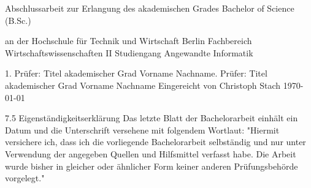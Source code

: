 \begin{titlepage}
	\huge{Abschlussarbeit}\newline
	\newline
	\normalsize
	zur Erlangung des akademischen Grades\newline
	Bachelor of Science (B.Sc.)\newline
	
	
	
	
	an der Hochschule für Technik und Wirtschaft Berlin\newline
	Fachbereich Wirtschaftswissenschaften II\newline
	Studiengang Angewandte Informatik
	
	\vfill
	
	1. Prüfer: Titel akademischer Grad Vorname Nachname. Prüfer: Titel akademischer Grad Vorname Nachname\newline
	\newline
	Eingereicht von Christoph Stach\newline
	\newline
	\today\newline
	
	\vfill
	
	7.5 Eigenständigkeitserklärung\newline
	Das letzte Blatt der Bachelorarbeit einhält ein Datum und die Unterschrift versehene mit folgendem Wortlaut:\newline
	\newline
	"Hiermit versichere ich, dass ich die vorliegende Bachelorarbeit selbständig und nur unter Verwendung der angegeben Quellen und Hilfsmittel verfasst habe. Die Arbeit wurde bisher in gleicher oder ähnlicher Form keiner anderen Prüfungsbehörde vorgelegt."\newline
	\newline
	\thispagestyle{empty}
	\pagebreak
\end{titlepage}
